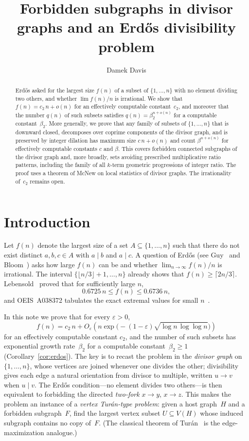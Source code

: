 \documentclass[11pt]{amsart}
\title{Forbidden subgraphs in divisor graphs and an Erd\H{o}s divisibility problem}
\author{Damek Davis}
\date{}
\begin{document}
\begin{abstract}
Erd\H{o}s asked for the largest size $f(n)$ of a subset of $\{1,\dots,n\}$ with no element dividing two others, and whether $\lim f(n)/n$ is irrational. We show that $f(n)=c_2\,n+o(n)$ for an effectively computable constant~$c_2$, and moreover that the number $q(n)$ of such subsets satisfies $q(n)=\beta_2^{n+o(n)}$ for a computable constant~$\beta_2$. More generally, we prove that any family of subsets of $\{1,\dots,n\}$ that is downward closed, decomposes over coprime components of the divisor graph, and is preserved by integer dilation has maximum size $c\,n+o(n)$ and count $\beta^{n+o(n)}$ for effectively computable constants $c$ and $\beta$. This covers forbidden connected subgraphs of the divisor graph and, more broadly, sets avoiding prescribed multiplicative ratio patterns, including the family of all $k$-term geometric progressions of integer ratio. The proof uses a theorem of McNew on local statistics of divisor graphs. The irrationality of~$c_2$ remains open.
\end{abstract}

\maketitle

\section{Introduction}

Let \(f(n)\) denote the largest size of a set \(A\subseteq \{1,\dots,n\}\) such that there do not exist distinct \(a,b,c\in A\) with \(a\mid b\) and \(a\mid c\). A question of Erd\H{o}s (see Guy~\cite[Problem~B24]{Gu04} and Bloom~\cite[Problem 1062]{BloomEP}) asks how large \(f(n)\) can be and whether \(\lim_{n\to\infty} f(n)/n\) is irrational. The interval \(\{\lfloor n/3\rfloor+1,\dots,n\}\) already shows that \(f(n)\ge \lceil 2n/3\rceil\). Lebensold~\cite{Le76} proved that for sufficiently large \(n\),
\[
0.6725\,n\le f(n)\le 0.6736\,n,
\]
and OEIS~A038372 tabulates the exact extremal values for small \(n\)~\cite{OEISA038372}.

In this note we prove that for every \(\varepsilon > 0\),
\[
f(n)=c_2\,n+O_{\varepsilon}\!\left(n\exp\!\bigl(-(1-\varepsilon)\sqrt{\log n\,\log\log n}\bigr)\right)
\]
for an effectively computable constant \(c_2\), and the number of such subsets has exponential growth rate~\(\beta_2\) for a computable constant~\(\beta_2\ge 1\) (Corollary~\ref{cor:erdos}). The key is to recast the problem in the \emph{divisor graph} on \(\{1,\dots,n\}\), whose vertices are joined whenever one divides the other; divisibility gives each edge a natural orientation from divisor to multiple, written \(u\to v\) when \(u\mid v\). The Erd\H{o}s condition---no element divides two others---is then equivalent to forbidding the directed \emph{two-fork} \(x\to y\), \(x\to z\). This makes the problem an instance of a \emph{vertex Tur\'an-type problem}: given a host graph~\(H\) and a forbidden subgraph~\(F\), find the largest vertex subset \(U\subseteq V(H)\) whose induced subgraph contains no copy of~\(F\). (The classical theorem of Tur\'an~\cite{Tu41} is the edge-maximization analogue.)
\end{document}
